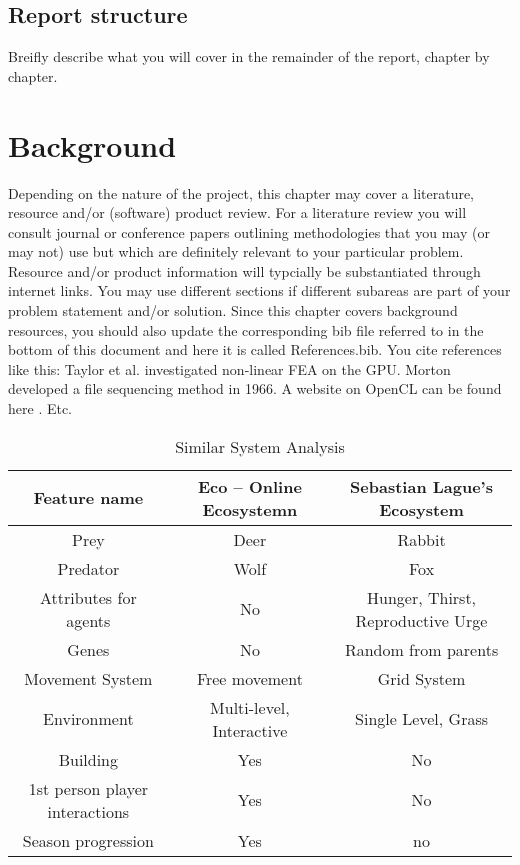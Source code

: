 \documentclass[a4paper, oneside, 11pt]{report}
\begin{document}
\section{Report structure}
Breifly describe what you will cover in the remainder of the report, chapter by chapter.

\chapter{Background}


Depending on the nature of the project, this chapter may cover a literature, resource and/or (software) product review. For a literature review you will consult journal or conference papers outlining methodologies that you may (or may not) use but which are definitely relevant to your particular problem. Resource and/or product information will typcially be substantiated through internet links. 
You may use different sections if different subareas are part of your problem statement and/or solution. 
Since this chapter covers background resources, you should also update the corresponding bib file referred to in the bottom of this document and here it is called References.bib.
You cite references like this: Taylor et al. \cite{Taylor:2007} investigated non-linear FEA on the GPU. Morton \cite{Morton:1966} developed a file sequencing method in 1966. A website on OpenCL can be found here \cite{Soos:2012}. Etc.

\begin{table}[ht]
	\caption{Similar System Analysis} %
	\centering %
	\begin{tabular}{c c c} %
		\hline\hline %
		Feature name & Eco – Online Ecosystemn  & Sebastian Lague’s Ecosystem \\ [0.5ex] %
		\hline %
		Prey  & Deer  & Rabbit \\ %
		Predator  & Wolf  & Fox \\
		Attributes for agents  & No  & Hunger, Thirst, Reproductive Urge \\
		Genes  & No & Random from parents \\ 
		Movement System   & Free movement & Grid System \\ 
		Environment   & Multi-level, Interactive  & Single Level, Grass \\ 
		Building   & Yes & No \\
		1st person player interactions   & Yes & No\\
		Season progression   & Yes & no \\ [1ex] %
		\hline %
	\end{tabular}
	\label{table:nonlin} %
\end{table}
\end{document}
